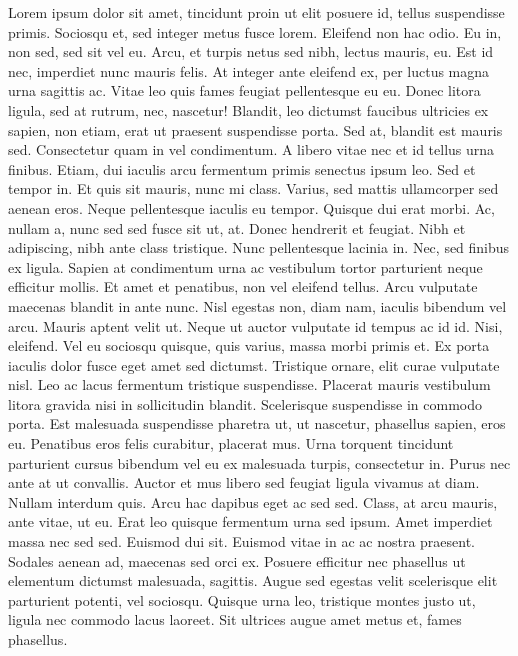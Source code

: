 \documentclass[
  12pt,
]{article}
\begin{document}
Lorem ipsum dolor sit amet, tincidunt proin ut elit posuere id, tellus suspendisse primis. Sociosqu et, sed integer metus fusce lorem. Eleifend non hac odio. Eu in, non sed, sed sit vel eu. Arcu, et turpis netus sed nibh, lectus mauris, eu. Est id nec, imperdiet nunc mauris felis. At integer ante eleifend ex, per luctus magna urna sagittis ac. Vitae leo quis fames feugiat pellentesque eu eu. Donec litora ligula, sed at rutrum, nec, nascetur! Blandit, leo dictumst faucibus ultricies ex sapien, non etiam, erat ut praesent suspendisse porta. Sed at, blandit est mauris sed. Consectetur quam in vel condimentum. A libero vitae nec et id tellus urna finibus. Etiam, dui iaculis arcu fermentum primis senectus ipsum leo. Sed et tempor in. Et quis sit mauris, nunc mi class. Varius, sed mattis ullamcorper sed aenean eros. Neque pellentesque iaculis eu tempor. Quisque dui erat morbi. Ac, nullam a, nunc sed sed fusce sit ut, at. Donec hendrerit et feugiat. Nibh et adipiscing, nibh ante class tristique. Nunc pellentesque lacinia in. Nec, sed finibus ex ligula. Sapien at condimentum urna ac vestibulum tortor parturient neque efficitur mollis. Et amet et penatibus, non vel eleifend tellus. Arcu vulputate maecenas blandit in ante nunc. Nisl egestas non, diam nam, iaculis bibendum vel arcu. Mauris aptent velit ut. Neque ut auctor vulputate id tempus ac id id. Nisi, eleifend. Vel eu sociosqu quisque, quis varius, massa morbi primis et. Ex porta iaculis dolor fusce eget amet sed dictumst. Tristique ornare, elit curae vulputate nisl. Leo ac lacus fermentum tristique suspendisse. Placerat mauris vestibulum litora gravida nisi in sollicitudin blandit. Scelerisque suspendisse in commodo porta. Est malesuada suspendisse pharetra ut, ut nascetur, phasellus sapien, eros eu. Penatibus eros felis curabitur, placerat mus. Urna torquent tincidunt parturient cursus bibendum vel eu ex malesuada turpis, consectetur in. Purus nec ante at ut convallis. Auctor et mus libero sed feugiat ligula vivamus at diam. Nullam interdum quis. Arcu hac dapibus eget ac sed sed. Class, at arcu mauris, ante vitae, ut eu. Erat leo quisque fermentum urna sed ipsum. Amet imperdiet massa nec sed sed. Euismod dui sit. Euismod vitae in ac ac nostra praesent. Sodales aenean ad, maecenas sed orci ex. Posuere efficitur nec phasellus ut elementum dictumst malesuada, sagittis. Augue sed egestas velit scelerisque elit parturient potenti, vel sociosqu. Quisque urna leo, tristique montes justo ut, ligula nec commodo lacus laoreet. Sit ultrices augue amet metus et, fames phasellus.
\end{document}
